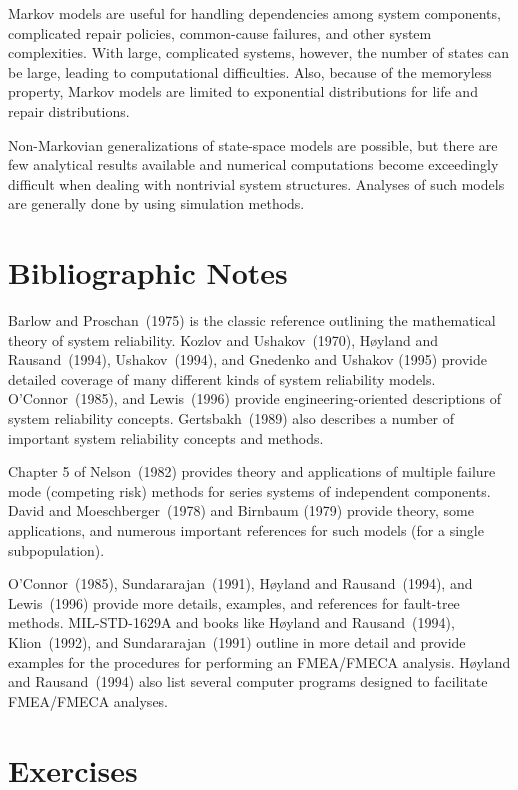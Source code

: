 Markov models are useful for handling dependencies among system
components, complicated repair policies, common-cause failures,
and other system complexities.  With large, complicated systems,
however, the number of states can be large, leading to
computational difficulties. Also, because of the memoryless
property, Markov models are limited to exponential distributions for
life and repair distributions.

Non-Markovian generalizations of state-space models are possible, but
there are few analytical results available and numerical
computations become exceedingly difficult when dealing with
nontrivial system structures. Analyses of such models are generally
done by using simulation methods.

\section*{Bibliographic Notes}

Barlow and Proschan~(1975) is the classic reference outlining the
mathematical theory of system reliability. Kozlov and Ushakov~(1970),
H\o yland and Rausand~(1994), Ushakov~(1994), and Gnedenko and Ushakov
(1995) provide detailed coverage of many different kinds of system
reliability models. O'Connor~(1985), and Lewis~(1996) provide
engineering-oriented descriptions of system reliability
concepts.  Gertsbakh~(1989) also describes a number of important
system reliability concepts and methods.

Chapter 5 of Nelson~(1982) provides theory and applications of multiple
failure mode (competing risk) methods for series systems of
independent components.  David and Moeschberger~(1978) and Birnbaum
(1979) provide theory, some applications, and numerous important
references for such models (for a single subpopulation).

O'Connor~(1985), Sundararajan~(1991), H\o yland and Rausand~(1994),
and Lewis~(1996) provide more details, examples, and references for
fault-tree methods.  MIL-STD-1629A and books like H\o yland and
Rausand~(1994), Klion~(1992), and Sundararajan~(1991) outline in
more detail and provide examples for the procedures for performing
an FMEA/FMECA analysis.  H\o yland and Rausand~(1994) also list
several computer programs designed to facilitate FMEA/FMECA
analyses.
\section*{Exercises}

